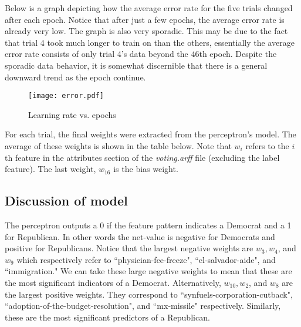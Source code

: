 \documentclass[12pt,letterpaper]{article}
\begin{document}
Below is a graph depicting how the average error rate for the five trials changed after each epoch. Notice that after just a few epochs, the average error rate is already very low. The graph is also very sporadic. This may be due to the fact that trial 4 took much longer to train on than the others, essentially the average error rate consists of only trial 4's data beyond the $46$th epoch. Despite the sporadic data behavior, it is somewhat discernible that there is a general downward trend as the epoch continue.

\bigskip

\begin{wrapfigure}{r}{0.6\textwidth}
\centering
\texttt{[image: error.pdf]} 
\caption{Learning rate vs. epochs}
\vspace{-30pt}
\end{wrapfigure}

For each trial, the final weights were extracted from the perceptron's model. The average of these weights is shown in the table below. Note that $w_i$ refers to the $i$th feature in the attributes section of the \emph{voting.arff} file (excluding the label feature). The last weight, $w_{16}$ is the bias weight.

\subsection*{Discussion of model}

The perceptron outputs a 0 if the feature pattern indicates a Democrat and a 1 for Republican. In other words the net-value is negative for Democrats and positive for Republicans. Notice that the largest negative weights are $w_3, w_4$, and $w_9$ which respectively refer to ``physician-fee-freeze", ``el-salvador-aide", and ``immigration." We can take these large negative weights to mean that these are the most significant indicators of a Democrat. Alternatively, $w_{10}, w_2$, and $w_8$ are the largest positive weights. They correspond to ``synfuels-corporation-cutback", ``adoption-of-the-budget-resolution", and ``mx-missile" respectively. Similarly, these are the most significant predictors of a Republican. 
\end{document}
